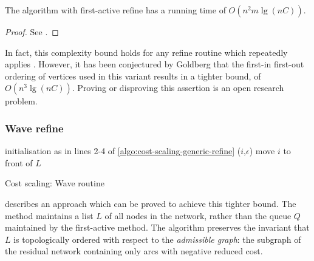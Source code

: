 \begin{thm} \label{thm:cost-scaling-first-active-complexity}
The algorithm with first-active refine has a running time of $O(n^2m \lg (nC))$.
\end{thm}
\begin{proof}
See \cite[theorem~6.2]{Goldberg:1990}.
\end{proof}

\begin{remark}
In fact, this complexity bound holds for any refine routine which repeatedly applies . However, it has been conjectured by Goldberg that the first-in first-out ordering of vertices used in this variant results in a tighter bound, of $O(n^3 \lg (nC))$. Proving or disproving this assertion is an open research problem.
\end{remark}

\subsubsection{Wave refine}

\begin{algorithm}
\begin{algorithmic}[1]
    \State initialisation as in lines 2-4 of \cref{algo:cost-scaling-generic-refine}
     
    \Repeat
                \State {}($i$,$\epsilon$)
                    \State move $i$ to front of $L$
                \EndIf
            \EndIf
        \EndFor
    \EndFunction
\end{algorithmic}
\caption{Cost scaling: Wave  routine}
\label{algo:cost-scaling-wave-refine}
\end{algorithm}

 describes an approach which can be proved to achieve this tighter bound. The method maintains a list $L$ of all nodes in the network, rather than the queue $Q$ maintained by the first-active method. The algorithm preserves the invariant that $L$ is topologically ordered with respect to the \emph{admissible graph}: the subgraph of the residual network containing only arcs with negative reduced cost.

